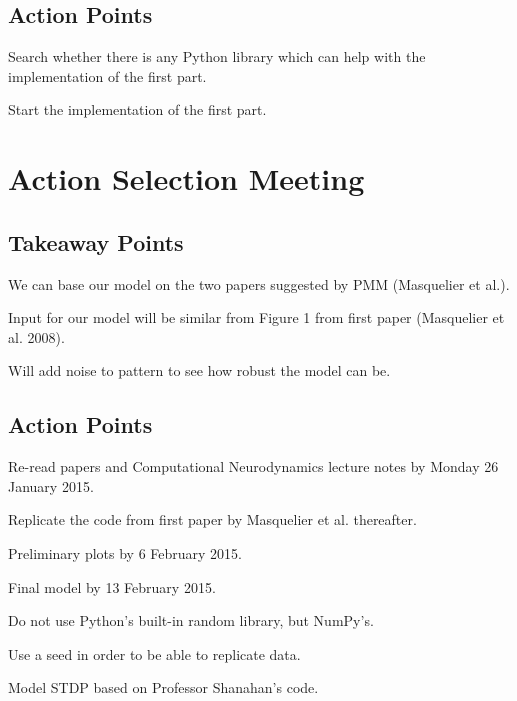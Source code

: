 \documentclass{article}
\begin{document}
{\addtolength{\leftskip}{3mm}
\subsection*{Action Points}
}
\begin{compactenum}
\item Search whether there is any Python library which can help with the implementation of the first part.
\item Start the implementation of the first part.
\end{compactenum}

\section*{Action Selection Meeting}

{\addtolength{\leftskip}{3mm}
\subsection*{Takeaway Points}
}
\begin{compactenum}
\item We can base our model on the two papers suggested by PMM (Masquelier et al.).
\item Input for our model will be similar from Figure 1 from first paper (Masquelier et al. 2008).
\item Will add noise to pattern to see how robust the model can be.
\end{compactenum}

{\addtolength{\leftskip}{3mm}
\subsection*{Action Points}
}
\begin{compactenum}
\item Re-read papers and Computational Neurodynamics lecture notes by Monday 26 January 2015.
\item Replicate the code from first paper by Masquelier et al. thereafter.
    \begin{compactenum}
    \item Preliminary plots by 6 February 2015.
 	\item Final model by 13 February 2015.
 	\end{compactenum}
\item Do not use Python's built-in random library, but NumPy's.
\item Use a seed in order to be able to replicate data.
\item Model STDP based on Professor Shanahan's code.
\end{compactenum}
\end{document}
